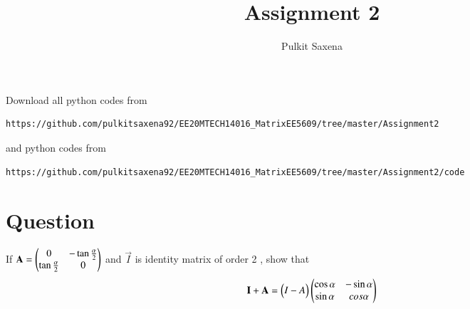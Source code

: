 \documentclass[journal,12pt,twocolumncolumn]{IEEEtran}
\begin{document}
     \def\rightbox#1{\makebox[0in][r]{#1}}
     \def\centbox#1{\makebox[0in]{#1}}
     \def\topbox#1{\raisebox{-\baselineskip}[0in][0in]{#1}}
     \def\midbox#1{\raisebox{-0.5\baselineskip}[0in][0in]{#1}}
\vspace{3cm}
\title{Assignment 2}
\author{Pulkit Saxena}
\maketitle
\bigskip
\renewcommand{\thefigure}{1}
\renewcommand{\thetable}{\theenumi}
Download all python codes from 
\begin{lstlisting}
https://github.com/pulkitsaxena92/EE20MTECH14016_MatrixEE5609/tree/master/Assignment2
\end{lstlisting}
%
and python codes from 
%
\begin{lstlisting}
https://github.com/pulkitsaxena92/EE20MTECH14016_MatrixEE5609/tree/master/Assignment2/code
\end{lstlisting}
\section{\textbf{Question}}
If $\mathbf{A}=\begin{pmatrix}0 & -\tan\frac{\alpha}{2} \\ \tan\frac{\alpha}{2} & 0 \end{pmatrix}$ and $\vec{I}$ is identity matrix of order 2 , show that
\begin{align}
  \mathbf{I}+\mathbf{A}=\begin{pmatrix}I-A\end{pmatrix}\begin{pmatrix}\cos\alpha & -\sin\alpha \\ \sin\alpha & cos\alpha\end{pmatrix}
\end{align}
\end{document}

